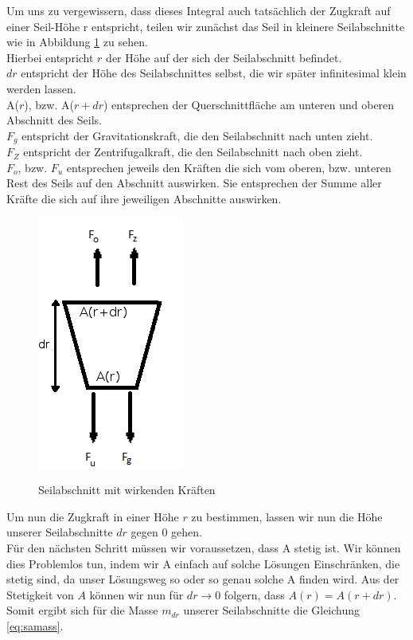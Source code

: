 \documentclass[a4paper, 10pt]{report}
\begin{document}
Um uns zu vergewissern, dass dieses Integral auch tatsächlich der Zugkraft auf einer Seil-Höhe r entspricht, teilen wir zunächst das Seil in kleinere Seilabschnitte wie in Abbildung \ref{fig:differential} zu sehen.\\
Hierbei entspricht $r$ der Höhe auf der sich der Seilabschnitt befindet.\\
$dr$ entspricht der Höhe des Seilabschnittes selbst, die wir später infinitesimal klein werden lassen.\\
A($r$), bzw. A($r+dr$) entsprechen der Querschnittfläche am unteren und oberen Abschnitt des Seils.\\
$F_g$ entspricht der Gravitationskraft, die den Seilabschnitt nach unten zieht.\\
$F_Z$ entspricht der Zentrifugalkraft, die den Seilabschnitt nach oben zieht.\\
$F_o$, bzw. $F_u$ entsprechen jeweils den Kräften die sich vom oberen, bzw. unteren Rest des Seils auf den Abschnitt auswirken. Sie entsprechen der Summe aller Kräfte die sich auf ihre jeweiligen Abschnitte auswirken.

\begin{figure}[!htb]
	\centering
	\includegraphics{differential}
	\label{fig:differential}
	\caption{Seilabschnitt mit wirkenden Kräften}
\end{figure}

Um nun die Zugkraft in einer Höhe $r$ zu bestimmen, lassen wir nun die Höhe unserer Seilabschnitte $dr$ gegen 0 gehen.\\
Für den nächsten Schritt müssen wir voraussetzen, dass A stetig ist. Wir können dies Problemlos tun, indem wir A einfach auf solche Lösungen Einschränken, die stetig sind, da unser Lösungsweg so oder so genau solche A finden wird. Aus der Stetigkeit von $A$ können wir nun für $dr \rightarrow 0$ folgern, dass $A(r)=A(r+dr)$. Somit ergibt sich für die Masse $m_{dr}$ unserer Seilabschnitte die Gleichung \ref{eq:samass}.
\end{document}
